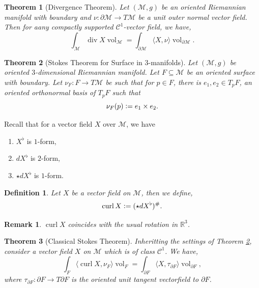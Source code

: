 \documentclass[8pt]{article}
\newtheorem{theorem}{Theorem} [section]
\newtheorem{definition}{Definition}[section]
\newtheorem{remark}{Remark}[section]
\DeclareMathOperator{\vol}{vol}
\DeclareMathOperator{\diverg}{div}
\DeclareMathOperator{\curl}{curl}
\newcommand{\defeq}{\vcentcolon=}
\newcommand{\R}[0]{\mathbb{R}}
\newcommand{\M}[0]{\mathcal{M}}
\begin{document}
\begin{theorem}[Divergence Theorem]
  \label{theorem_divergence}
  Let $(\M,g)$ be an oriented Riemannian manifold with boundary and $\nu:\partial\M\to T\M$ be a unit outer normal vector field. Then for aany compactly supported $\mathcal{C}^1$-vector field, we have, 
  \begin{equation*}
    \int_\M \diverg X\vol_\M = \int_{\partial\M}\langle X,\nu\rangle\vol_{\partial\M}.
  \end{equation*}
\end{theorem}

\begin{theorem}[Stokes Theorem for Surface in $3$-manifolds]
  Let $(\M,g)$ be oriented $3$-dimensional Riemannian manifold. Let $F\subseteq\M$ be an oriented surface with boundary.
  Let $\nu_F:F\to T\M$ be such that for $p\in F$, there is $e_1,e_2\in T_pF$, an oriented orthonormal basis of $T_pF$ such that 
  \begin{equation*}
    \nu_F(p)\defeq e_1\times e_2.
  \end{equation*}
  \label{theorem_stokes_surface}
\end{theorem}

Recall that for a vector field $X$ over $\M$, we have
\begin{enumerate}[1).]
  \item $X^\flat$ is $1$-form,
  \item $dX^\flat$ is $2$-form,
  \item $\star dX^\flat$ is $1$-form. 
\end{enumerate}

\begin{definition}
  Let $X$ be a vector field on $\M$, then we define,
  \begin{equation*}
    \curl X\defeq (\star dX^\flat)^\#.
  \end{equation*}
\end{definition}

\begin{remark}
  $\curl X$ coincides with the usual rotation in $\R^3$.
\end{remark}

\begin{theorem}[Classical Stokes Theorem]
  Inheritting the settings of Theorem \ref{theorem_stokes_surface}, consider a vector field $X$ on $\M$ which is of class $\mathcal{C}^1$. We have,
  \begin{equation*}
    \int_F\langle\curl X,\nu_F\rangle\vol_F = \int_{\partial F}\langle X,\tau_{\partial F}\rangle \vol_{\partial F},
  \end{equation*}
  where $\tau_{\partial F}:\partial F\to T\partial F$ is the oriented unit tangent vectorfield to $\partial F$.
\end{theorem}
\end{document}
